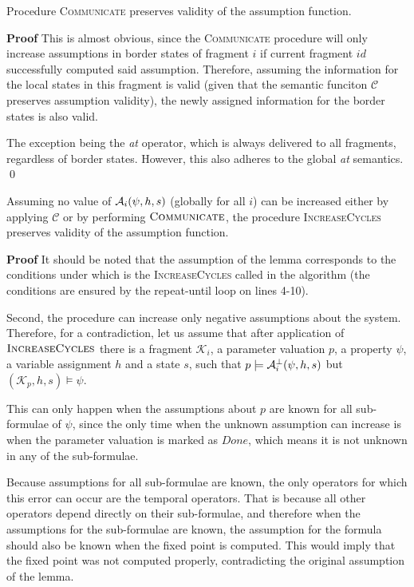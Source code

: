 \begin{lemma}
		\label{lemma:comm}
	Procedure \textsc{Communicate} preserves validity of the assumption function.
\end{lemma}

\textbf{Proof} This is almost obvious, since the \textsc{Communicate} procedure will only increase assumptions in border states of fragment $i$ if current fragment $id$ successfully computed said assumption. Therefore, assuming the information for the local states in this fragment is valid (given that the semantic funciton $\mathcal{C}$ preserves assumption validity), the newly assigned information for the border states is also valid.

The exception being the \emph{at} operator, which is always delivered to all fragments, regardless of border states. However, this also adheres to the global \emph{at} semantics. \qed

\begin{lemma}
		\label{lemma:cycles}
	Assuming no value of $\mathcal{A}_i(\psi, h, s)$ (globally for all $i$) can be increased either by applying $\mathcal{C}$ or by performing $\textsc{Communicate}$, the procedure \textsc{IncreaseCycles} preserves validity of the assumption function.
\end{lemma}

\textbf{Proof} It should be noted that the assumption of the lemma corresponds to the conditions under which is the \textsc{IncreaseCycles} called in the algorithm (the conditions are ensured by the repeat-until loop on lines 4-10). 

Second, the procedure can increase only negative assumptions about the system. Therefore, for a contradiction, let us assume that after application of $\textsc{IncreaseCycles}$ there is a fragment $\mathcal{K}_i$, a parameter valuation $p$, a property $\psi$, a variable assignment $h$ and a state $s$, such that $p \models \mathcal{A}^\bot_i(\psi, h, s)$ but $(\mathcal{K}_p, h, s) \models \psi$. 

This can only happen when the assumptions about $p$ are known for all sub-formulae of $\psi$, since the only time when the unknown assumption can increase is when the parameter valuation is marked as $Done$, which means it is not unknown in any of the sub-formulae.

Because assumptions for all sub-formulae are known, the only operators for which this error can occur are the temporal operators. That is because all other operators depend directly on their sub-formulae, and therefore when the assumptions for the sub-formulae are known, the assumption for the formula should also be known when the fixed point is computed. This would imply that the fixed point was not computed properly, contradicting the original assumption of the lemma. 

